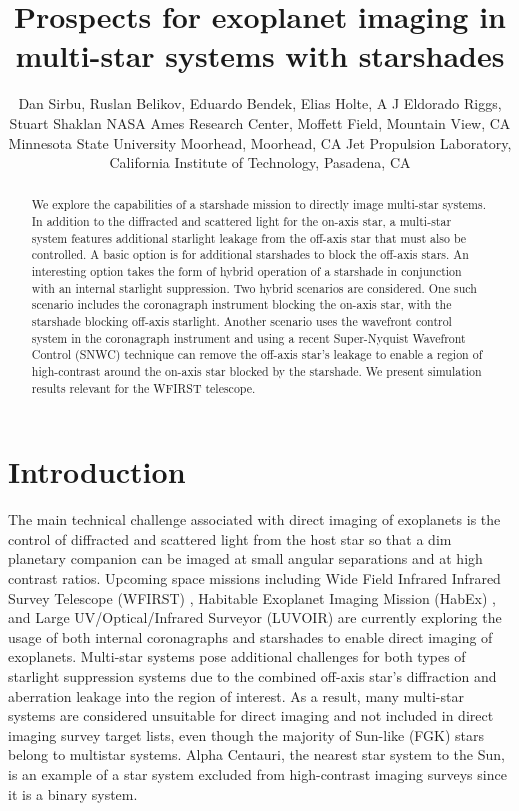 \documentclass[]{spie}  %
\title{Prospects for exoplanet imaging in multi-star systems with starshades}
\author{Dan Sirbu\supit{1}, Ruslan Belikov\supit{1}, Eduardo Bendek\supit{1}, Elias Holte\supit{1,2}, A J Eldorado Riggs\supit{3}, Stuart Shaklan\supit{3}
\skiplinehalf
\supit{1}
NASA Ames Research Center, Moffett Field, Mountain View, CA
\skiplinehalf
\supit{2}
Minnesota State University Moorhead, Moorhead, CA
\skiplinehalf
\supit{3}
Jet Propulsion Laboratory, California Institute of Technology, Pasadena, CA}
\begin{document}
 
  \maketitle 

\begin{abstract}

We explore the capabilities of a starshade mission to directly image multi-star systems. In addition to the diffracted and scattered light for the on-axis star, a multi-star system features additional starlight leakage from the off-axis star that must also be controlled. A basic option is for additional starshades to block the off-axis stars. An interesting option takes the form of hybrid operation of a starshade in conjunction with an internal starlight suppression. Two hybrid scenarios are considered. One such scenario includes the coronagraph instrument blocking the on-axis star, with the starshade blocking off-axis starlight. Another scenario uses the wavefront control system in the coronagraph instrument and using a recent Super-Nyquist Wavefront Control (SNWC) technique can remove the off-axis star’s leakage to enable a region of high-contrast around the on-axis star blocked by the starshade. We present simulation results relevant for the WFIRST telescope.

\end{abstract}


\section{Introduction} 

The main technical challenge associated with direct imaging of exoplanets is the control of diffracted and scattered light from the host star so that a dim planetary companion can be imaged at small angular separations and at high contrast ratios\cite{DesMarais02}. Upcoming space missions including Wide Field Infrared Infrared Survey Telescope  (WFIRST) \cite{Macintosh17}, Habitable Exoplanet Imaging Mission (HabEx) \cite{Menesson16, Stahl17}, and Large UV/Optical/Infrared Surveyor (LUVOIR) \cite{Bolcar17} are currently exploring the usage of both internal coronagraphs and starshades to enable direct imaging of exoplanets. Multi-star systems pose additional challenges for both types of starlight suppression systems due to the combined off-axis star's diffraction and aberration leakage into the region of interest. As a result, many multi-star systems are considered unsuitable for direct imaging and not included in direct imaging survey target lists, even though the majority of Sun-like (FGK) stars belong to multistar systems. Alpha Centauri, the nearest star system to the Sun, is an example of a star system excluded from high-contrast imaging surveys since it is a binary system.
\end{document}
